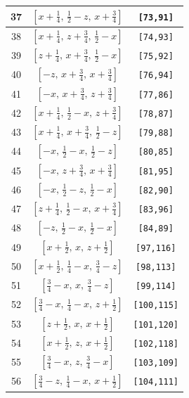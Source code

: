 \documentclass[fleqn,8pt]{jsarticle}
\begin{document}
\begin{longtable}{ccc}
37 & $\left[ x + \frac{1}{4},\, \frac{1}{2} - z,\, x + \frac{3}{4} \right]$ & {\tt [73,91]} \\ \hline
38 & $\left[ x + \frac{1}{4},\, z + \frac{3}{4},\, \frac{1}{2} - x \right]$ & {\tt [74,93]} \\ \hline
39 & $\left[ z + \frac{1}{4},\, x + \frac{3}{4},\, \frac{1}{2} - x \right]$ & {\tt [75,92]} \\ \hline
40 & $\left[ - z,\, x + \frac{3}{4},\, x + \frac{3}{4} \right]$ & {\tt [76,94]} \\ \hline
41 & $\left[ - x,\, x + \frac{3}{4},\, z + \frac{3}{4} \right]$ & {\tt [77,86]} \\ \hline
42 & $\left[ x + \frac{1}{4},\, \frac{1}{2} - x,\, z + \frac{3}{4} \right]$ & {\tt [78,87]} \\ \hline
43 & $\left[ x + \frac{1}{4},\, x + \frac{3}{4},\, \frac{1}{2} - z \right]$ & {\tt [79,88]} \\ \hline
44 & $\left[ - x,\, \frac{1}{2} - x,\, \frac{1}{2} - z \right]$ & {\tt [80,85]} \\ \hline
45 & $\left[ - x,\, z + \frac{3}{4},\, x + \frac{3}{4} \right]$ & {\tt [81,95]} \\ \hline
46 & $\left[ - x,\, \frac{1}{2} - z,\, \frac{1}{2} - x \right]$ & {\tt [82,90]} \\ \hline
47 & $\left[ z + \frac{1}{4},\, \frac{1}{2} - x,\, x + \frac{3}{4} \right]$ & {\tt [83,96]} \\ \hline
48 & $\left[ - z,\, \frac{1}{2} - x,\, \frac{1}{2} - x \right]$ & {\tt [84,89]} \\ \hline
49 & $\left[ x + \frac{1}{2},\, x,\, z + \frac{1}{2} \right]$ & {\tt [97,116]} \\ \hline
50 & $\left[ x + \frac{1}{2},\, \frac{1}{4} - x,\, \frac{3}{4} - z \right]$ & {\tt [98,113]} \\ \hline
51 & $\left[ \frac{3}{4} - x,\, x,\, \frac{3}{4} - z \right]$ & {\tt [99,114]} \\ \hline
52 & $\left[ \frac{3}{4} - x,\, \frac{1}{4} - x,\, z + \frac{1}{2} \right]$ & {\tt [100,115]} \\ \hline
53 & $\left[ z + \frac{1}{2},\, x,\, x + \frac{1}{2} \right]$ & {\tt [101,120]} \\ \hline
54 & $\left[ x + \frac{1}{2},\, z,\, x + \frac{1}{2} \right]$ & {\tt [102,118]} \\ \hline
55 & $\left[ \frac{3}{4} - x,\, z,\, \frac{3}{4} - x \right]$ & {\tt [103,109]} \\ \hline
56 & $\left[ \frac{3}{4} - z,\, \frac{1}{4} - x,\, x + \frac{1}{2} \right]$ & {\tt [104,111]} \\ \hline

\end{longtable}
\end{document}
